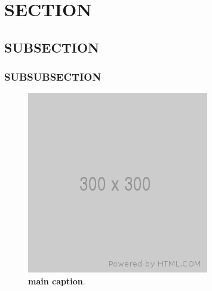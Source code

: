 \documentclass[12pt, lettersize]{article}
\begin{document}

\newpage



\newpage

\section{SECTION}
\lipsum[1]

\subsection{SUBSECTION}
\lipsum[1-2]

\subsubsection{SUBSUBSECTION}
\lipsum[1-3]

\begin{figure}[H]
  \centering
    \includegraphics[scale=1]{placeholder_300.png}
    \caption[main caption]
    {
      \textbf{main caption}\protect\footnotemark.
      \blindtext
    }
    \label{figure:}
\end{figure}
\footnotetext{\blindtext}
\end{document}
